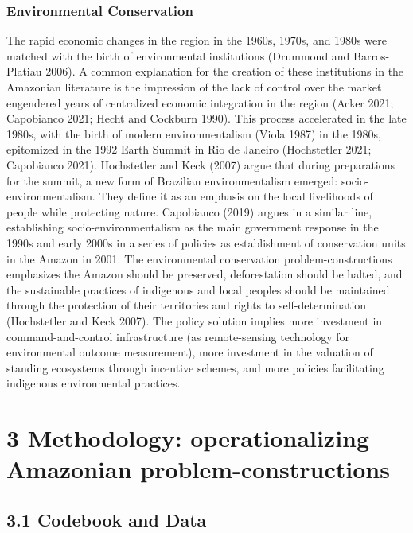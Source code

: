 \documentclass[
]{article}
\begin{document}
\hypertarget{environmental-conservation}{%
\subsubsection{Environmental
Conservation}\label{environmental-conservation}}

The rapid economic changes in the region in the 1960s, 1970s, and 1980s
were matched with the birth of environmental institutions (Drummond and
Barros-Platiau 2006). A common explanation for the creation of these
institutions in the Amazonian literature is the impression of the lack
of control over the market engendered years of centralized economic
integration in the region (Acker 2021; Capobianco 2021; Hecht and
Cockburn 1990). This process accelerated in the late 1980s, with the
birth of modern environmentalism (Viola 1987) in the 1980s, epitomized
in the 1992 Earth Summit in Rio de Janeiro (Hochstetler 2021; Capobianco
2021). Hochstetler and Keck (2007) argue that during preparations for
the summit, a new form of Brazilian environmentalism emerged:
socio-environmentalism. They define it as an emphasis on the local
livelihoods of people while protecting nature. Capobianco (2019) argues
in a similar line, establishing socio-environmentalism as the main
government response in the 1990s and early 2000s in a series of policies
as establishment of conservation units in the Amazon in 2001. The
environmental conservation problem-constructions emphasizes the Amazon
should be preserved, deforestation should be halted, and the sustainable
practices of indigenous and local peoples should be maintained through
the protection of their territories and rights to self-determination
(Hochstetler and Keck 2007). The policy solution implies more investment
in command-and-control infrastructure (as remote-sensing technology for
environmental outcome measurement), more investment in the valuation of
standing ecosystems through incentive schemes, and more policies
facilitating indigenous environmental practices.

\hypertarget{methodology-operationalizing-amazonian-problem-constructions}{%
\section{3 Methodology: operationalizing Amazonian
problem-constructions}\label{methodology-operationalizing-amazonian-problem-constructions}}

\hypertarget{codebook-and-data}{%
\subsection{3.1 Codebook and Data}\label{codebook-and-data}}
\end{document}
